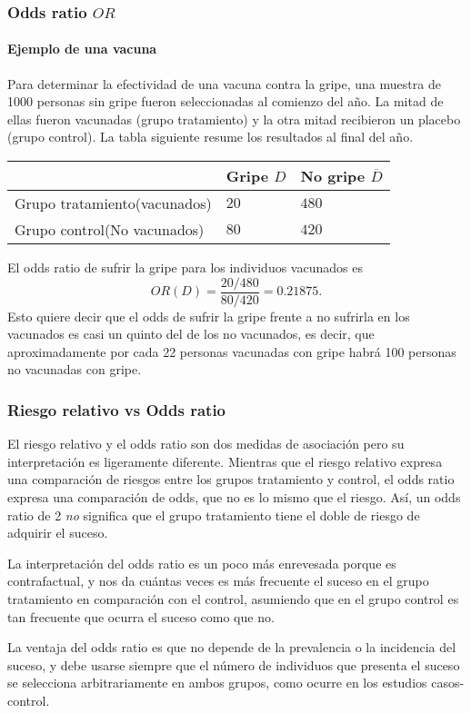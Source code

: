 \begin{frame}
\frametitle{Odds ratio $OR$}
\framesubtitle{Ejemplo de una vacuna}
Para determinar la efectividad de una vacuna contra la gripe, una muestra de 1000 personas sin gripe fueron seleccionadas al comienzo del año. 
La mitad de ellas fueron vacunadas (grupo tratamiento) y la otra mitad recibieron un placebo (grupo control).
La tabla siguiente resume los resultados al final del año.

\begin{center}
  \begin{tabular}{|m{3cm}|m{1.8cm}<{\centering}|m{1.8cm}<{\centering}|}
  \cline{2-3}
  \multicolumn{1}{c|}{} & Gripe $D$ & No gripe $\overline D$\\ 
  \hline
  Grupo tratamiento\newline (vacunados) & $20$ & $480$\\ 
  \hline 
  Grupo control\newline (No vacunados) & $80$ & $420$\\ 
  \hline
\end{tabular}
\end{center}

El odds ratio de sufrir la gripe para los individuos vacunados es
\[
  OR(D) = \frac{20/480}{80/420} = 0.21875.
\]
Esto quiere decir que el odds de sufrir la gripe frente a no sufrirla en los vacunados es casi un quinto del de los no vacunados, es decir, que aproximadamente por cada 22 personas vacunadas con gripe habrá 100 personas no vacunadas con gripe.
\end{frame}


\begin{frame}
\frametitle{Riesgo relativo vs Odds ratio} 
El riesgo relativo y el odds ratio son dos medidas de asociación pero su interpretación es ligeramente diferente. 
Mientras que el riesgo relativo expresa una comparación de riesgos entre los grupos tratamiento y control, el odds ratio expresa una comparación de odds, que no es lo mismo que el riesgo.
Así, un odds ratio de 2 \emph{no} significa que el grupo tratamiento tiene el doble de riesgo de adquirir el suceso.

La interpretación del odds ratio es un poco más enrevesada porque es contrafactual, y nos da cuántas veces es más frecuente el suceso en el grupo tratamiento en comparación con el control, asumiendo que en el grupo control es tan frecuente que ocurra el suceso como que no.  

La ventaja del odds ratio es que no depende de la prevalencia o la incidencia del suceso, y debe usarse siempre que el número de individuos que presenta el suceso se selecciona arbitrariamente en ambos grupos, como ocurre en los estudios casos-control.
\end{frame}


